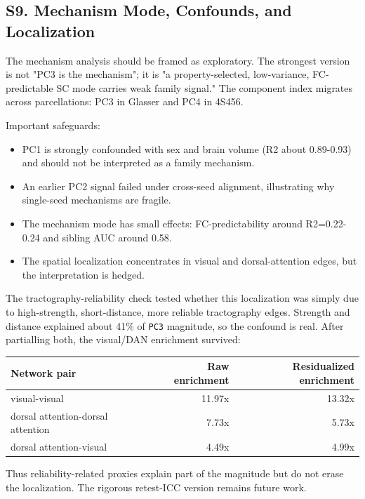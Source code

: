 \subsection{S9. Mechanism Mode, Confounds, and Localization}\label{s9-mechanism-mode-confounds-and-localization}

The mechanism analysis should be framed as exploratory. The strongest version is not "PC3 is the mechanism"; it is "a property-selected, low-variance, FC-predictable SC mode carries weak family signal." The component index migrates across parcellations: PC3 in Glasser and PC4 in 4S456.

Important safeguards:

\begin{itemize}
\tightlist
\item
  PC1 is strongly confounded with sex and brain volume (R2 about 0.89-0.93) and should not be interpreted as a family mechanism.
\item
  An earlier PC2 signal failed under cross-seed alignment, illustrating why single-seed mechanisms are fragile.
\item
  The mechanism mode has small effects: FC-predictability around R2=0.22-0.24 and sibling AUC around 0.58.
\item
  The spatial localization concentrates in visual and dorsal-attention edges, but the interpretation is hedged.
\end{itemize}

The tractography-reliability check tested whether this localization was simply due to high-strength, short-distance, more reliable tractography edges. Strength and distance explained about 41\% of \texttt{\textbar{}PC3\textbar{}} magnitude, so the confound is real. After partialling both, the visual/DAN enrichment survived:

{\def\LTcaptype{none} %
\begin{longtable}[]{@{}lrr@{}}
\toprule\noalign{}
Network pair & Raw enrichment & Residualized enrichment \\
\midrule\noalign{}
\endhead
\bottomrule\noalign{}
\endlastfoot
visual-visual & 11.97x & 13.32x \\
dorsal attention-dorsal attention & 7.73x & 5.73x \\
dorsal attention-visual & 4.49x & 4.99x \\
\end{longtable}
}

Thus reliability-related proxies explain part of the magnitude but do not erase the localization. The rigorous retest-ICC version remains future work.

